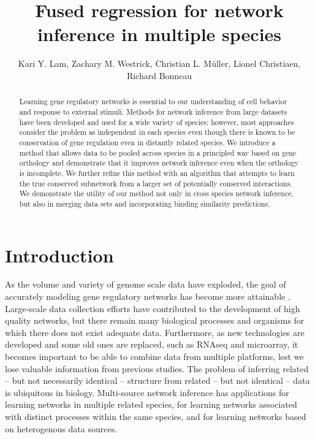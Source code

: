\documentclass[11pt]{article}
\begin{document}
\title{Fused regression for network inference in multiple species}
\author{Kari Y. Lam, Zachary M. Westrick, Christian L. M\"{u}ller, Lionel Christiaen, Richard Bonneau}
\maketitle

\begin{abstract}
Learning gene regulatory networks is essential to our understanding of cell behavior and response to external stimuli. Methods for network inference from large datasets have been developed and used for a wide variety of species; however, most approaches consider the problem as independent in each species even though there is known to be conservation of gene regulation even in distantly related species. We introduce a method that allows data to be pooled across species in a principled way based on gene orthology and demonstrate that it improves network inference even when the orthology is incomplete. We further refine this method with an algorithm that attempts to learn the true conserved subnetwork from a larger set of potentially conserved interactions. We demonstrate the utility of our method not only in cross species network inference, but also in merging data sets and incorporating binding similarity predictions.
\end{abstract}

\section{Introduction}
As the volume and variety of genome scale data have exploded, the goal of accurately modeling gene regulatory networks has become more attainable \cite{bonneau_predictive_2007, ciofani_validated_2012, carro_transcriptional_2010}. Large-scale data collection efforts have contributed to the development of high quality networks, but there remain many biological processes and organisms for which there does not exist adequate data. Furthermore, as new technologies are developed and some old ones are replaced, such as RNAseq and microarray, it becomes important to be able to combine data from multiple platforms, lest we lose valuable information from previous studies. The problem of inferring related -- but not necessarily identical -- structure from related -- but not identical -- data is ubiquitous in biology. Multi-source network inference has applications for learning networks in multiple related species, for learning networks associated with distinct processes within the same species, and for learning networks based on heterogenous data sources.
\end{document}
